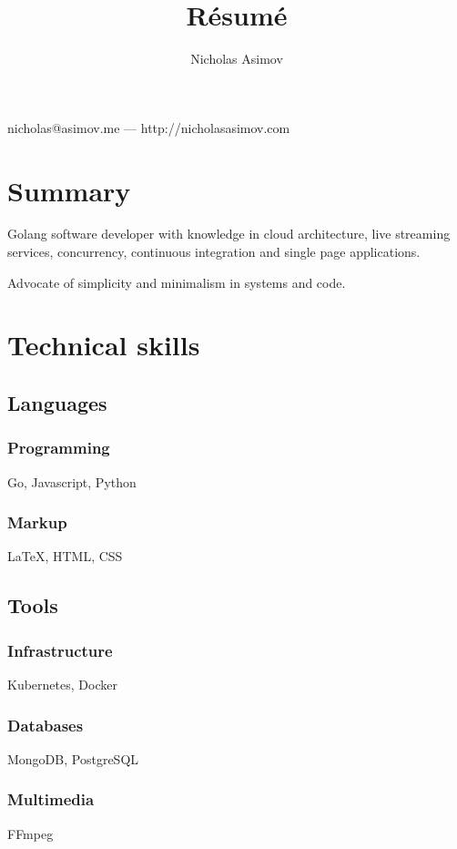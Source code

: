 \documentclass[paper=a4,fontsize=11pt]{scrartcl}
\makeatletter
\renewcommand{\maketitle}{
    \begin{center}
        {
            \huge
            \bfseries
            \theauthor
        }
 
        \vspace{.25em}
        nicholas@asimov.me --- http://nicholasasimov.com
    \end{center}
}
\makeatother
\begin{document}
\title{R\'esum\'e}
\author{Nicholas Asimov}

\maketitle

\section{Summary}

Golang software developer with knowledge in cloud architecture, live streaming services, concurrency,
continuous integration and single page applications.

Advocate of simplicity and minimalism in systems and code.

\section{Technical skills}

\subsection{Languages}

\subsubsection{Programming}
Go, Javascript, Python

\subsubsection{Markup}
{\LaTeX}, HTML, CSS


\subsection{Tools}

\subsubsection{Infrastructure}
Kubernetes, Docker

\subsubsection{Databases}
MongoDB, PostgreSQL

\subsubsection{Multimedia}
FFmpeg
\end{document}
